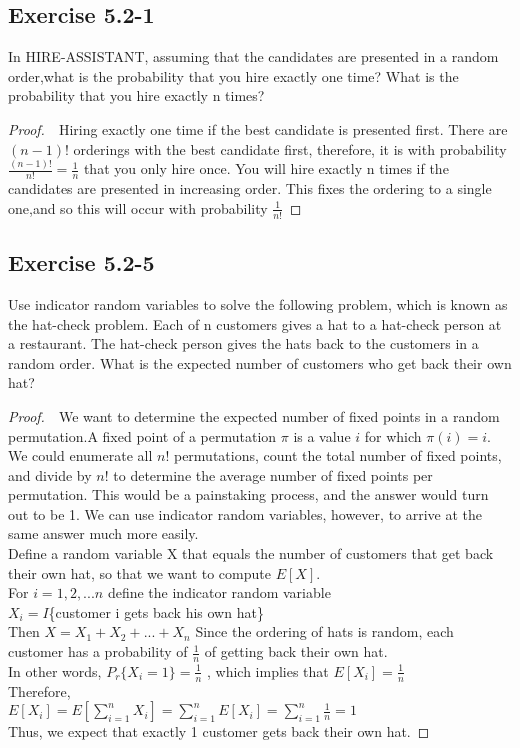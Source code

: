 \documentclass{article}
\begin{document}
\subsection*{Exercise 5.2-1}
In HIRE-ASSISTANT, assuming that the candidates are presented in a random order,what is the probability that you hire exactly one time? What is the probability that you hire exactly n times?
\begin{proof}
    $ $\newline
    $ $\newline
Hiring exactly one time if the best candidate is presented first. There are $(n-1)!$ orderings with the best candidate first, therefore, it is with probability $\frac{(n-1)!}{n!} = \frac{1}{n}$ that you only hire once. You will hire exactly n times if the candidates are presented in increasing order. This fixes the ordering to a single one,and so this will occur with probability $\frac{1}{n!}$
\end{proof}

\subsection*{Exercise 5.2-5}
Use indicator random variables to solve the following problem, which is known as the hat-check problem. Each of n customers gives a hat to a hat-check person at a restaurant. The hat-check person gives the hats back to the customers in a random order. What is the expected number of customers who get back their own hat?
\begin{proof}
    $ $\newline
    $ $\newline
 We want to determine the expected number of fixed points in a random permutation.A fixed point of a permutation $\pi$ is a value $i$ for which $\pi(i) = i$.\\
 We could enumerate all $n!$ permutations, count the total number of fixed points, and divide by $n!$ to determine the average number of fixed points per permutation. This would be a painstaking process, and the answer would turn out to be 1. We can use indicator random variables, however, to arrive at the same answer much more easily.\\
Define a random variable X that equals the number of customers that get back their own hat, so that we want to compute $E[X]$.\\
For $i=1,2,...n$ define the indicator random variable\\
$X_i = I$\{customer i gets back his own hat\}\\
Then $X = X_1+X_2+...+X_n$
Since the ordering of hats is random, each customer has a probability of $\frac{1}{n}$ of getting back their own hat. \\
In other words, $P_r\{X_i=1\}=\frac{1}{n}$ , which implies that $E[X_i]=\frac{1}{n}$\\
Therefore,\\
$E[X_i]=E[\displaystyle\sum_{i=1}^{n}X_i]=\displaystyle\sum_{i=1}^{n}E[X_i]=\displaystyle\sum_{i=1}^{n}\frac{1}{n}=1$
\\
Thus, we expect that exactly 1 customer gets back their own hat.
\end{proof}
\end{document}
